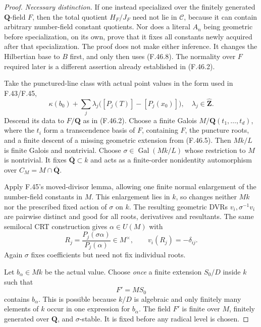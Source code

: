 \begin{proof}
\emph{Necessary distinction.} If one instead specialized over the
finitely generated \(\mathbf Q\)-field \(F\), then the total quotient
\(H_F/J_F\) need not lie in \(\mathcal C\), because it can contain
arbitrary number-field constant quotients. Nor does a literal
\(A_n\) being geometric before specialization, on its own, prove that
it fixes all constants newly acquired after that specialization. The
proof does not make either inference. It changes the Hilbertian base to
\(B\) first, and only then uses \textup{(F.46.8)}. The normality over \(F\) required
later is a different assertion already established in \textup{(F.46.2)}.


Take the punctured-line class with actual point values in the form used
in F.43/F.45,
\[
 \kappa(b_0)+\sum_j\lambda_j
     \bigl([P_j(T)]-[P_j(x_0)]\bigr),
                     \quad\lambda_j\in\widehat{\mathbf Z}. \tag{F.46.10}
\]
Descend its data to \(F/\mathbf Q\) as in \textup{(F.46.2)}. Choose a finite Galois
\(M/\mathbf Q(t_1,\ldots,t_d)\), where the \(t_i\) form a
transcendence basis of \(F\), containing \(F\), the puncture roots, and
a finite descent of a missing geometric extension from \textup{(F.46.5)}. Then
\(Mk/L\) is finite Galois and nontrivial. Choose
\(\sigma\in\operatorname{Gal}(Mk/L)\) whose restriction to \(M\) is
nontrivial. It fixes \(\overline{\mathbf Q}\subset k\) and acts as a
finite-order nonidentity automorphism over
\(C_M=M\cap\overline{\mathbf Q}\).

Apply F.45's moved-divisor lemma, allowing one finite normal enlargement
of the number-field constants in \(M\). This enlargement lies in
\(k\), so changes neither \(Mk\) nor the prescribed fixed action of
\(\sigma\) on \(k\). The resulting geometric DVRs
\(v_i,\sigma^{-1}v_i\) are pairwise distinct and good for all roots,
derivatives and resultants. The same semilocal CRT construction gives
\(\alpha\in U(M)\) with
\[
 R_j=\frac{P_j(\sigma\alpha)}{P_j(\alpha)}\in M^\times,
                        \qquad v_i(R_j)=-\delta_{ij}.      \tag{F.46.11}
\]
Again \(\sigma\) fixes coefficients but need not fix individual roots.

Let \(b_\alpha\in Mk\) be the actual value. Choose \emph{once} a finite
extension \(S_0/D\) inside \(k\) such that
\[
                         F'=MS_0
\]
contains \(b_\alpha\). This is possible because \(k/D\) is algebraic
and only finitely many elements of \(k\) occur in one expression for
\(b_\alpha\). The field \(F'\) is finite over \(M\), finitely
generated over \(\mathbf Q\), and \(\sigma\)-stable. It is fixed
before any radical level is chosen.


\end{proof}
